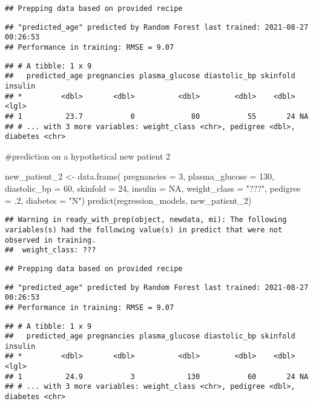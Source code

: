 \documentclass[
]{article}
\newenvironment{Shaded}{\begin{snugshade}}{\end{snugshade}}
\newcommand{\AttributeTok}[1]{\textcolor[rgb]{0.77,0.63,0.00}{#1}}
\newcommand{\ConstantTok}[1]{\textcolor[rgb]{0.00,0.00,0.00}{#1}}
\newcommand{\DecValTok}[1]{\textcolor[rgb]{0.00,0.00,0.81}{#1}}
\newcommand{\FunctionTok}[1]{\textcolor[rgb]{0.00,0.00,0.00}{#1}}
\newcommand{\NormalTok}[1]{#1}
\newcommand{\OtherTok}[1]{\textcolor[rgb]{0.56,0.35,0.01}{#1}}
\newcommand{\StringTok}[1]{\textcolor[rgb]{0.31,0.60,0.02}{#1}}
\begin{document}
\begin{verbatim}
## Prepping data based on provided recipe
\end{verbatim}

\begin{verbatim}
## "predicted_age" predicted by Random Forest last trained: 2021-08-27 00:26:53
## Performance in training: RMSE = 9.07
\end{verbatim}

\begin{verbatim}
## # A tibble: 1 x 9
##   predicted_age pregnancies plasma_glucose diastolic_bp skinfold insulin
## *         <dbl>       <dbl>          <dbl>        <dbl>    <dbl> <lgl>  
## 1          23.7           0             80           55       24 NA     
## # ... with 3 more variables: weight_class <chr>, pedigree <dbl>, diabetes <chr>
\end{verbatim}

\#prediction on a hypothetical new patient 2

\begin{Shaded}
\begin{Highlighting}[]
\NormalTok{new\_patient\_2 }\OtherTok{\textless{}{-}} \FunctionTok{data.frame}\NormalTok{(}
  \AttributeTok{pregnancies =} \DecValTok{3}\NormalTok{,}
  \AttributeTok{plasma\_glucose =} \DecValTok{130}\NormalTok{,}
  \AttributeTok{diastolic\_bp =} \DecValTok{60}\NormalTok{,}
  \AttributeTok{skinfold =} \DecValTok{24}\NormalTok{,}
  \AttributeTok{insulin =} \ConstantTok{NA}\NormalTok{,}
  \AttributeTok{weight\_class =} \StringTok{"???"}\NormalTok{,}
  \AttributeTok{pedigree =}\NormalTok{ .}\DecValTok{2}\NormalTok{,}
  \AttributeTok{diabetes =} \StringTok{"N"}\NormalTok{)}
\FunctionTok{predict}\NormalTok{(regression\_models, new\_patient\_2)}
\end{Highlighting}
\end{Shaded}

\begin{verbatim}
## Warning in ready_with_prep(object, newdata, mi): The following variables(s) had the following value(s) in predict that were not observed in training. 
##  weight_class: ???
\end{verbatim}

\begin{verbatim}
## Prepping data based on provided recipe
\end{verbatim}

\begin{verbatim}
## "predicted_age" predicted by Random Forest last trained: 2021-08-27 00:26:53
## Performance in training: RMSE = 9.07
\end{verbatim}

\begin{verbatim}
## # A tibble: 1 x 9
##   predicted_age pregnancies plasma_glucose diastolic_bp skinfold insulin
## *         <dbl>       <dbl>          <dbl>        <dbl>    <dbl> <lgl>  
## 1          24.9           3            130           60       24 NA     
## # ... with 3 more variables: weight_class <chr>, pedigree <dbl>, diabetes <chr>
\end{verbatim}
\end{document}
